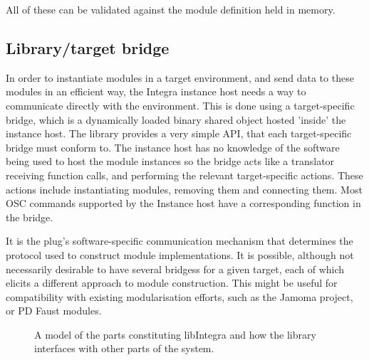 \documentclass{article}
\begin{document}
All of these can be validated against the module definition held in memory.
 
\subsection{Library/target bridge}\label{subsec:bridge}

In order to instantiate modules in a target environment, and send data to these modules in an efficient way, the Integra instance host needs a way to communicate directly with the environment. This is done using a target-specific bridge, which is a dynamically loaded binary shared object hosted 'inside' the instance host. The library provides a very simple API, that each target-specific bridge must conform to. The instance host has no knowledge of the software being used to host the module instances so the bridge acts like a translator receiving function calls, and performing the relevant target-specific actions. These actions include instantiating modules, removing them and connecting them. Most OSC commands supported by the Instance host have a corresponding function in the bridge.

It is the plug's software-specific communication mechanism that determines the protocol used to construct module implementations. It is possible, although not necessarily desirable to have several bridgess for a given target, each of which elicits a different approach to module construction. This might be useful for compatibility with existing modularisation efforts, such as the Jamoma project, or PD Faust modules.

\begin{figure}
\centerline{}
\caption{A model of the parts constituting libIntegra and how the library interfaces with other parts of the system.}
\label{fig:model}
\end{figure}
\end{document}
